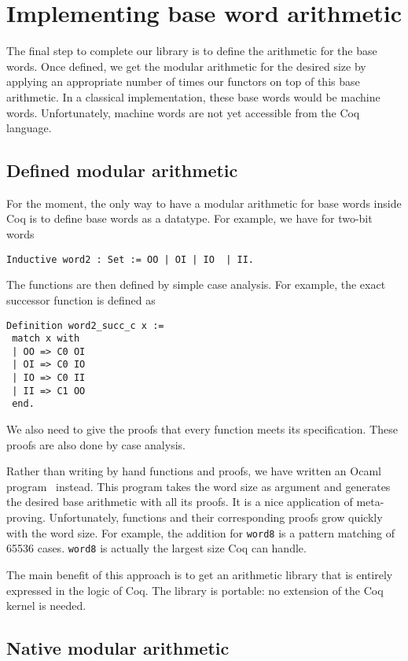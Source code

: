 \section{Implementing base word arithmetic \label{word}}

The final step to complete our library is to define the arithmetic for the 
base words. 
Once defined,  we get the modular arithmetic for the desired size by 
applying an appropriate number of times our functors on top of this base arithmetic. 
In a classical implementation, these base words would be machine words.
Unfortunately, machine words are not yet accessible from the {\sc Coq} 
language. 

\subsection{Defined modular arithmetic}

For the moment, the only way to have a modular arithmetic for base words 
inside {\sc Coq} is to define base words as a datatype. 
For example, we have for two-bit words
\begin{verbatim}
Inductive word2 : Set := OO | OI | IO  | II.
\end{verbatim}
The functions are then defined by simple case analysis. For example,
the exact successor function is defined as
\begin{verbatim}
Definition word2_succ_c x :=
 match x with
 | OO => C0 OI
 | OI => C0 IO
 | IO => C0 II
 | II => C1 OO
 end.
\end{verbatim}
We also need to give the proofs that every function meets its specification.
These proofs are also done by case analysis. 

Rather than writing by hand functions and proofs, we have
written an {\sc Ocaml} program~\cite{Ocaml} instead.
This program takes the word size as argument and generates the 
desired base arithmetic with all its proofs. 
It is a nice application of meta-proving. Unfortunately, 
functions and their corresponding proofs grow quickly with the word size. 
For example, the addition for {\tt word8} is a pattern matching of 
65536 cases. {\tt word8} is actually the largest size {\sc Coq} can handle. 

The main benefit of  this approach is to get an arithmetic library that is 
entirely expressed in the logic of {\sc Coq}. The library is portable: 
no extension of the {\sc Coq} kernel is needed. 

\subsection{Native modular arithmetic}

